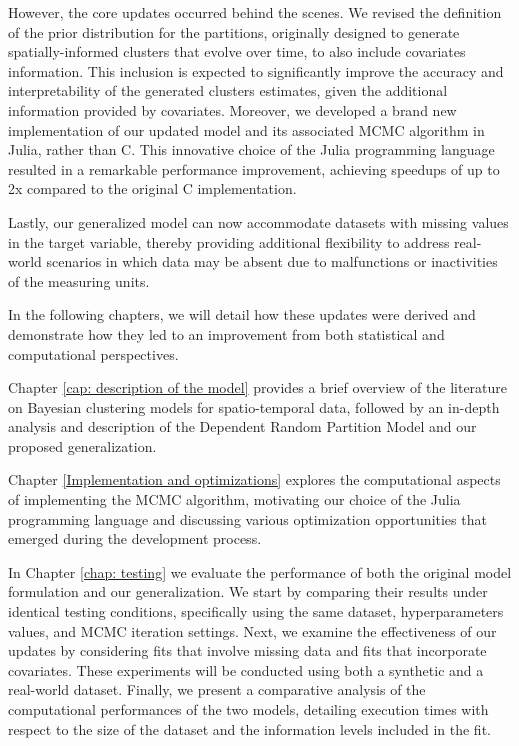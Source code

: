 \documentclass[12pt,	%
	a4paper,		%
	twoside,		%
	openright,		%
	titlepage,%
	]{book}
\theoremstyle{definition}
\begin{document}
However, the core updates occurred behind the scenes. We revised the definition of the prior distribution for the partitions, originally designed to generate spatially-informed clusters that evolve over time, to also include covariates information. This inclusion is expected to significantly improve the accuracy and interpretability of the generated clusters estimates, given the additional information provided by covariates. Moreover, we developed a brand new implementation of our updated model and its associated MCMC algorithm in Julia, rather than C. This innovative choice of the Julia programming language resulted in a remarkable performance improvement, achieving speedups of up to 2x compared to the original C implementation.

Lastly, our generalized model can now accommodate datasets with missing values in the target variable, thereby providing additional flexibility to address real-world scenarios in which data may be absent due to malfunctions or inactivities of the measuring units. 

In the following chapters, we will detail how these updates were derived and demonstrate how they led to an improvement from both statistical and computational perspectives.

Chapter \ref{cap: description of the model} provides a brief overview of the literature on Bayesian clustering models for spatio-temporal data, followed by an in-depth analysis and description of the Dependent Random Partition Model and our proposed generalization.

Chapter \ref{Implementation and optimizations} explores the computational aspects of implementing the MCMC algorithm, motivating our choice of the Julia programming language and discussing various optimization opportunities that emerged during the development process.

In Chapter \ref{chap: testing} we evaluate the performance of both the original model formulation and our generalization. We start by comparing their results under identical testing conditions, specifically using the same dataset, hyperparameters values, and MCMC iteration settings. Next, we examine the effectiveness of our updates by considering fits that involve missing data and fits that incorporate covariates. These experiments will be conducted using both a synthetic and a real-world dataset. Finally, we present a comparative analysis of the computational performances of the two models, detailing execution times with respect to the size of the dataset and the information levels included in the fit.
 
\end{document}
